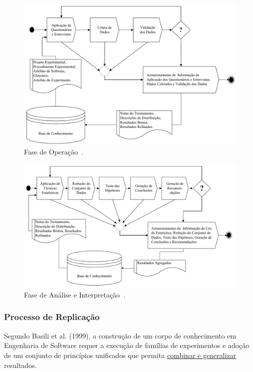 \documentclass[aspectratio=169]{beamer}
\begin{document}
\begin{frame}
\justifying

\begin{figure}
\centering
\includegraphics[scale=0.25]{images/operacao.png}
\caption{Fase de Operação~\cite{Garcia06}.}
\label{image:operacao}
\end{figure}

\end{frame}

\begin{frame}
\justifying

\begin{figure}
\centering
\includegraphics[scale=0.25]{images/analise.png}
\caption{Fase de Análise e Interpretação~\cite{Garcia06}.}
\label{image:analise}
\end{figure}

\end{frame}

\begin{frame}
\frametitle{Processo de Replicação}
\justifying
Segundo Basili et al. (1999), a construção de um corpo de conhecimento em Engenharia de Software requer a execução de famílias de experimentos e adoção de um conjunto de princípios unificados que permita \underline{combinar e generalizar} resultados.
\end{frame}
\end{document}
